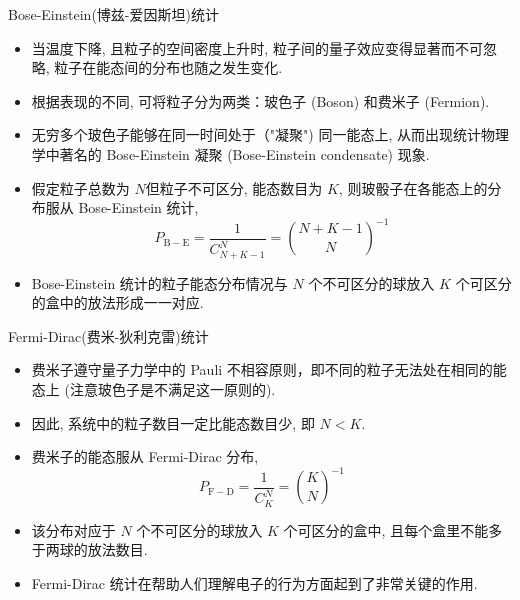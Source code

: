 \begin{frame}{{\rm Bose-Einstein}(博兹-爱因斯坦)统计}
\begin{itemize}[<+-|alert@+>]
	\item 当温度下降, 且粒子的空间密度上升时, 粒子间的量子效应变得显著而不可忽略, 粒子在能态间的分布也随之发生变化.
	\item 根据表现的不同, 可将粒子分为两类：玻色子 (Boson) 和费米子 (Fermion).
	\item 无穷多个玻色子能够在同一时间处于（"凝聚") 同一能态上, 从而出现统计物理学中著名的 Bose-Einstein 凝聚 (Bose-Einstein condensate) 现象.
	\item 假定粒子总数为 \( N \)但粒子不可区分, 能态数目为 \( K \), 则玻骰子在各能态上的分布服从 Bose-Einstein 统计,
	\[
	P_{\mathrm{B}-\mathrm{E}}%
	=\dfrac{1}{C_{N+K-1}^N}=\binom{N+K-1}{N}^{-1}
	\]
	\item Bose-Einstein 统计的粒子能态分布情况与 \( N \) 个不可区分的球放入 \( K \) 个可区分的盒中的放法形成一一对应.
\end{itemize}



\end{frame}


\begin{frame}{{\rm Fermi-Dirac}(费米-狄利克雷)统计}

\begin{itemize}[<+-|alert@+>]
	\item 费米子遵守量子力学中的 Pauli 不相容原则，即不同的粒子无法处在相同的能态上 (注意玻色子是不满足这一原则的).
	\item 因此, 系统中的粒子数目一定比能态数目少, 即 \( N<K \).
	\item 费米子的能态服从 Fermi-Dirac 分布,
	\[
	P_{\mathrm{F}-\mathrm{D}}=\dfrac{1}{C_K^N}=\binom{K}{N}^{-1}
	\]
	\item 该分布对应于 \( N \) 个不可区分的球放入 \( K \) 个可区分的盒中, 且每个盒里不能多于两球的放法数目.
	\item Fermi-Dirac 统计在帮助人们理解电子的行为方面起到了非常关键的作用.
\end{itemize}

\end{frame}



